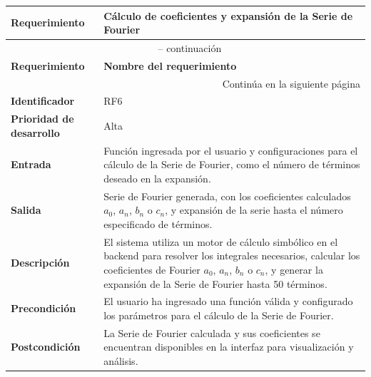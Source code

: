 \begin{longtable}{|m{3.5cm}|m{9.5cm}|}
	\hline
	\rowcolor{black!75} \color{white}\textbf{Requerimiento} & \color{white}\textbf{Cálculo de coeficientes y expansión de la Serie de Fourier} \\
	\hline
	\endfirsthead
	\multicolumn{2}{c}{{\tablename\ \thetable{} -- continuación}} \\
	\hline
	\rowcolor{black!75} \color{white}\textbf{Requerimiento} & \color{white}\textbf{Nombre del requerimiento} \\
	\hline
	\endhead
	\hline \multicolumn{2}{r}{{Continúa en la siguiente página}} \\
	\endfoot
	\hline
	\endlastfoot
	
	\textbf{Identificador} & RF6 \\
	\hline
	\textbf{Prioridad de desarrollo} & Alta \\
	\hline
	\textbf{Entrada} & Función ingresada por el usuario y configuraciones para el cálculo de la Serie de Fourier, como el número de términos deseado en la expansión. \\
	\hline
	\textbf{Salida} & Serie de Fourier generada, con los coeficientes calculados \( a_0 \), \( a_n \), \( b_n \) o \( c_n \), y expansión de la serie hasta el número especificado de términos. \\
	\hline
	\textbf{Descripción} & El sistema utiliza un motor de cálculo simbólico en el backend para resolver los integrales necesarios, calcular los coeficientes de Fourier \( a_0 \), \( a_n \), \( b_n \) o \( c_n \), y generar la expansión de la Serie de Fourier hasta 50 términos. \\
	\hline
	\textbf{Precondición} & El usuario ha ingresado una función válida y configurado los parámetros para el cálculo de la Serie de Fourier. \\
	\hline
	\textbf{Postcondición} & La Serie de Fourier calculada y sus coeficientes se encuentran disponibles en la interfaz para visualización y análisis. \\
	\hline
\end{longtable}
\caption{Requerimiento funcional No. 6} \label{tabla:RF6}
\vspace{0.5cm}

